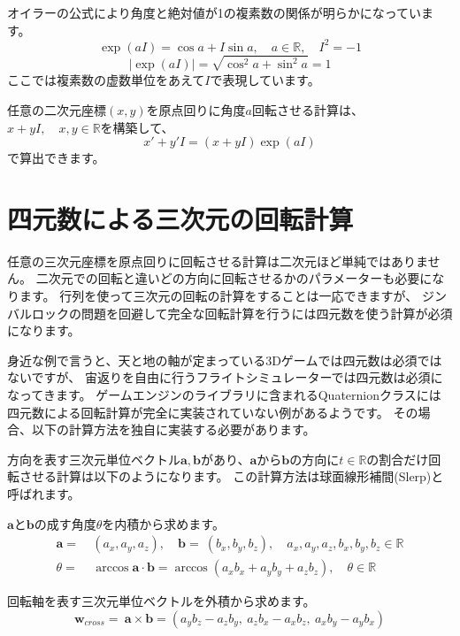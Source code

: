 \documentclass[a4paper,12pt,notitlepage]{jsreport}
\begin{document}
オイラーの公式により角度と絶対値が1の複素数の関係が明らかになっています。
\begin{equation}
\exp(aI)=\cos a+I\sin a,\quad a\in\mathbb{R},\quad I^2=-1
\end{equation}
\begin{equation}
|\exp(aI)|=\sqrt{\cos^2 a+\sin^2 a}=1
\end{equation}
ここでは複素数の虚数単位をあえて$I$で表現しています。

任意の二次元座標$(x,y)$を原点回りに角度$a$回転させる計算は、$x+yI,\quad x,y\in\mathbb{R}$を構築して、
\begin{equation}
x'+y'I=(x+yI)\exp(aI)
\end{equation}
で算出できます。

\section{四元数による三次元の回転計算}

任意の三次元座標を原点回りに回転させる計算は二次元ほど単純ではありません。
二次元での回転と違いどの方向に回転させるかのパラメーターも必要になります。
行列を使って三次元の回転の計算をすることは一応できますが、
ジンバルロックの問題を回避して完全な回転計算を行うには四元数を使う計算が必須になります。

身近な例で言うと、天と地の軸が定まっている3Dゲームでは四元数は必須ではないですが、
宙返りを自由に行うフライトシミュレーターでは四元数は必須になってきます。
ゲームエンジンのライブラリに含まれるQuaternionクラスには四元数による回転計算が完全に実装されていない例があるようです。
その場合、以下の計算方法を独自に実装する必要があります。

方向を表す三次元単位ベクトル$\bm{a},\bm{b}$があり、$\bm{a}$から$\bm{b}$の方向に$t\in\mathbb{R}$の割合だけ回転させる計算は以下のようになります。
この計算方法は球面線形補間(Slerp)と呼ばれます。

$\bm{a}$と$\bm{b}$の成す角度$\theta$を内積から求めます。
\begin{equation}
\begin{split}
\bm{a}=~&(a_x,a_y,a_z),\quad \bm{b}=~(b_x,b_y,b_z),\quad a_x,a_y,a_z,b_x,b_y,b_z\in\mathbb{R}\\
\theta=~&\arccos\bm{a}\cdot\bm{b}=\arccos(a_xb_x+a_yb_y+a_zb_z),\quad \theta\in\mathbb{R}
\end{split}
\end{equation}

回転軸を表す三次元単位ベクトルを外積から求めます。
\begin{equation}
\bm{w}_{cross}=~\bm{a}\times\bm{b}=(a_yb_z-a_zb_y,~a_zb_x-a_xb_z,~a_xb_y-a_yb_x)
\end{equation}
\end{document}
